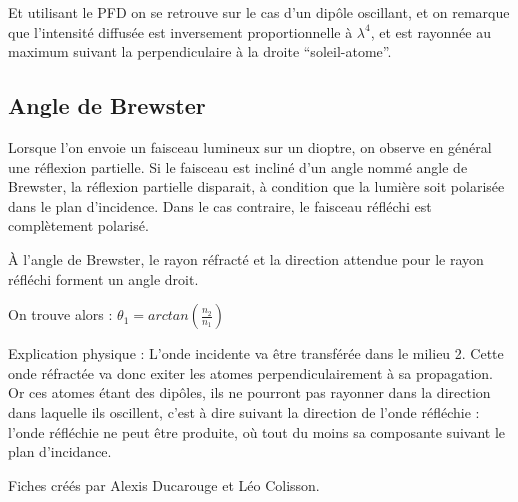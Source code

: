\documentclass[9pt]{article}
\begin{document}
\begin{multicols*}{2}
Et utilisant le PFD on se retrouve sur le cas d'un dipôle oscillant, et on remarque que l'intensité diffusée est inversement proportionnelle à $\lambda^4$, et est rayonnée au maximum suivant la perpendiculaire à la droite ``soleil-atome''.

\subsection{Angle de Brewster}
Lorsque l'on envoie un faisceau lumineux sur un dioptre, on observe en général une réflexion partielle. Si le faisceau est incliné d'un angle nommé angle de Brewster, la réflexion partielle disparait, à condition que la lumière soit polarisée dans le plan d'incidence. Dans le cas contraire, le faisceau réfléchi est complètement polarisé.

À l'angle de Brewster, le rayon réfracté et la direction attendue pour le rayon réfléchi forment un angle droit.

On trouve alors :
$\theta_1 = arctan(\frac{n_2}{n_1})$

Explication physique : L'onde incidente va être transférée dans le milieu 2. Cette onde réfractée va donc exiter les atomes perpendiculairement à sa propagation. Or ces atomes étant des dipôles, ils ne pourront pas rayonner dans la direction dans laquelle ils oscillent, c'est à dire suivant la direction de l'onde réfléchie : l'onde réfléchie ne peut être produite, où tout du moins sa composante suivant le plan d'incidance.

\footnotesize{Fiches créés par Alexis Ducarouge et Léo Colisson.}

\end{multicols*}
\end{document}
